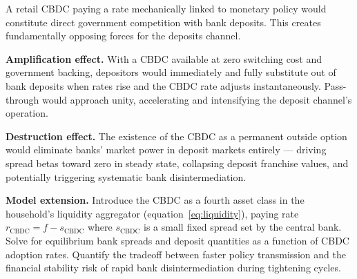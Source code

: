\documentclass[12pt,a4paper]{article}
\begin{document}
\begin{extbox}
A retail CBDC paying a rate mechanically linked to monetary policy would
constitute direct government competition with bank deposits. This creates
fundamentally opposing forces for the deposits channel.

\textbf{Amplification effect.} With a CBDC available at zero switching cost
and government backing, depositors would immediately and fully substitute out
of bank deposits when rates rise and the CBDC rate adjusts instantaneously.
Pass-through would approach unity, accelerating and intensifying the deposit
channel's operation.

\textbf{Destruction effect.} The existence of the CBDC as a permanent outside
option would eliminate banks' market power in deposit markets entirely ---
driving spread betas toward zero in steady state, collapsing deposit franchise
values, and potentially triggering systematic bank disintermediation.

\textbf{Model extension.} Introduce the CBDC as a fourth asset class in the
household's liquidity aggregator (equation~\ref{eq:liquidity}), paying rate
$r_{\text{CBDC}} = f - s_{\text{CBDC}}$ where $s_{\text{CBDC}}$ is a small
fixed spread set by the central bank. Solve for equilibrium bank spreads and
deposit quantities as a function of CBDC adoption rates. Quantify the tradeoff
between faster policy transmission and the financial stability risk of rapid
bank disintermediation during tightening cycles.
\end{extbox}
\end{document}

